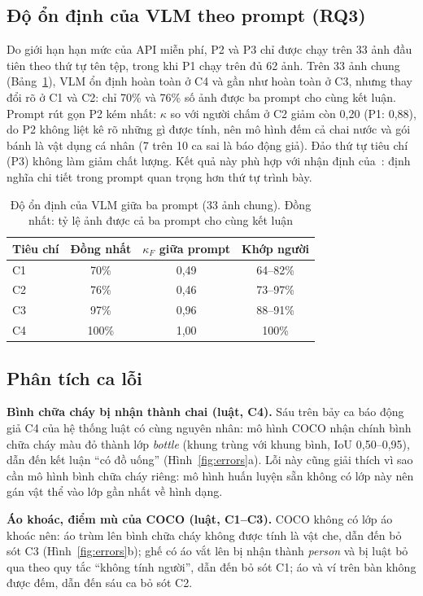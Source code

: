 \documentclass[conference]{IEEEtran}
\begin{document}
\subsection{Độ ổn định của VLM theo prompt (RQ3)}
Do giới hạn hạn mức của API miễn phí, P2 và P3 chỉ được chạy trên 33 ảnh đầu tiên theo thứ tự tên tệp, trong khi P1 chạy trên đủ 62 ảnh. Trên 33 ảnh chung (Bảng~\ref{tab:prompt}), VLM ổn định hoàn toàn ở C4 và gần như hoàn toàn ở C3, nhưng thay đổi rõ ở C1 và C2: chỉ 70\% và 76\% số ảnh được ba prompt cho cùng kết luận. Prompt rút gọn P2 kém nhất: $\kappa$ so với người chấm ở C2 giảm còn 0{,}20 (P1: 0{,}88), do P2 không liệt kê rõ những gì được tính, nên mô hình đếm cả chai nước và gói bánh là vật dụng cá nhân (7 trên 10 ca sai là báo động giả). Đảo thứ tự tiêu chí (P3) không làm giảm chất lượng. Kết quả này phù hợp với nhận định của~\cite{goyal2026zeroshot,weng2026prompt}: định nghĩa chi tiết trong prompt quan trọng hơn thứ tự trình bày.

\begin{table}[t]
\centering
\caption{Độ ổn định của VLM giữa ba prompt (33 ảnh chung). Đồng nhất: tỷ lệ ảnh được cả ba prompt cho cùng kết luận}
\label{tab:prompt}
\footnotesize
\begin{tabular}{lccc}
\toprule
Tiêu chí & Đồng nhất & $\kappa_F$ giữa prompt & Khớp người \\
\midrule
C1 & 70\% & 0{,}49 & 64--82\% \\
C2 & 76\% & 0{,}46 & 73--97\% \\
C3 & 97\% & 0{,}96 & 88--91\% \\
C4 & 100\% & 1{,}00 & 100\% \\
\bottomrule
\end{tabular}
\end{table}

\subsection{Phân tích ca lỗi}
\textbf{Bình chữa cháy bị nhận thành chai (luật, C4).} Sáu trên bảy ca báo động giả C4 của hệ thống luật có cùng nguyên nhân: mô hình COCO nhận chính bình chữa cháy màu đỏ thành lớp \emph{bottle} (khung trùng với khung bình, IoU 0{,}50--0{,}95), dẫn đến kết luận ``có đồ uống'' (Hình~\ref{fig:errors}a). Lỗi này cũng giải thích vì sao cần mô hình bình chữa cháy riêng: mô hình huấn luyện sẵn không có lớp này nên gán vật thể vào lớp gần nhất về hình dạng.

\textbf{Áo khoác, điểm mù của COCO (luật, C1--C3).} COCO không có lớp áo khoác nên: áo trùm lên bình chữa cháy không được tính là vật che, dẫn đến bỏ sót C3 (Hình~\ref{fig:errors}b); ghế có áo vắt lên bị nhận thành \emph{person} và bị luật bỏ qua theo quy tắc ``không tính người'', dẫn đến bỏ sót C1; áo và ví trên bàn không được đếm, dẫn đến sáu ca bỏ sót C2.
\end{document}
